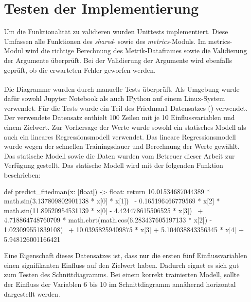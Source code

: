 \section{Testen der Implementierung}
\label{sec:impl_tests}

Um die Funktionalität zu validieren wurden Unittests implementiert. Diese Umfassen alle Funktionen des \emph{shared}- sowie des \emph{metrics}-Moduls. Im metrics-Modul wird die richtige Berechnung des Metrik-Dataframes sowie die Validierung der Argumente überprüft. Bei der Validierung der Argumente wird ebenfalls geprüft, ob die erwarteten Fehler geworfen werden.\\\\
\noindent Die Diagramme wurden durch manuelle Tests überprüft. Als Umgebung wurde dafür sowohl Jupyter Notebook als auch IPython auf einem Linux-System verwendet. Für die Tests wurde ein Teil des Friedman1 Datensatzes (\parencite{friedman_data}) verwendet. Der verwendete Datensatz enthielt 100 Zeilen mit je 10 Einflussvariablen und einem Zielwert. Zur Vorhersage der Werte wurde sowohl ein statisches Modell als auch ein lineares Regressionsmodell verwendet. Das lineare Regressionsmodell wurde wegen der schnellen Trainingsdauer und Berechnung der Werte gewählt. Das statische Modell sowie die Daten wurden vom Betreuer dieser Arbeit zur Verfügung gestellt. Das statische Modell wird mit der folgenden Funktion beschrieben:

\begin{PythonCode}
def predict_friedman(x: [float]) -> float:
    return 10.01534687044389 * math.sin(3.137809802901138 * x[0] * x[1]) \
        - 0.165196466779569 * x[2] * math.sin(11.89520954531139 * x[0] - 4.424478615506525 * x[3]) \
        + 4.718864748760709 * math.cbrt(math.cos(6.283437605197133 * x[2]) - 1.023099551839108) \
        + 10.03958259409875 * x[3] + 5.104038843356345 * x[4] + 5.948126001166421
\end{PythonCode}

\noindent Eine Eigenschaft dieses Datensatzes ist, dass nur die ersten fünf Einflussvariablen einen signifikanten Einfluss auf den Zielwert haben. Dadurch eignet es sich gut zum Testen des Schnittdiagramms. Bei einem korrekt trainierten Modell, sollte der Einfluss der Variablen 6 bis 10 im Schnittdiagramm annähernd horizontal dargestellt werden.